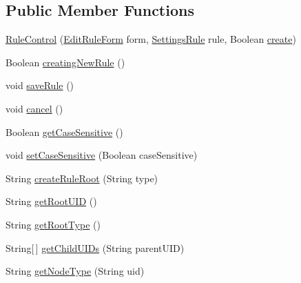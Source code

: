 \subsection*{Public Member Functions}
\begin{DoxyCompactItemize}
\item 
\hyperlink{class_web_analyzer_1_1_u_i_1_1_interaction_objects_1_1_rule_control_a8750fd77bb6508af4f27245be105a4cd}{Rule\+Control} (\hyperlink{class_web_analyzer_1_1_u_i_1_1_edit_rule_form}{Edit\+Rule\+Form} form, \hyperlink{class_web_analyzer_1_1_models_1_1_settings_model_1_1_settings_rule}{Settings\+Rule} rule, Boolean \hyperlink{_u_i_2_h_t_m_l_resources_2js_2lib_2underscore_8min_8js_a8bd5981157799459d39a59e8c4a0de04}{create})
\item 
Boolean \hyperlink{class_web_analyzer_1_1_u_i_1_1_interaction_objects_1_1_rule_control_a536423d979ea29cbc78acd7af260e047}{creating\+New\+Rule} ()
\item 
void \hyperlink{class_web_analyzer_1_1_u_i_1_1_interaction_objects_1_1_rule_control_a94100d3e36e224ebf511dc3f8c18ca27}{save\+Rule} ()
\item 
void \hyperlink{class_web_analyzer_1_1_u_i_1_1_interaction_objects_1_1_rule_control_a800eb65fd64f59274eef8862feb1aa16}{cancel} ()
\item 
Boolean \hyperlink{class_web_analyzer_1_1_u_i_1_1_interaction_objects_1_1_rule_control_a8dab0dfc04ad5b917a3f0b0d66e3b26f}{get\+Case\+Sensitive} ()
\item 
void \hyperlink{class_web_analyzer_1_1_u_i_1_1_interaction_objects_1_1_rule_control_a2d4fe3b5e5bb273fc4289dffa1e9672b}{set\+Case\+Sensitive} (Boolean case\+Sensitive)
\item 
String \hyperlink{class_web_analyzer_1_1_u_i_1_1_interaction_objects_1_1_rule_control_a27dad22845932db3e98f3e9029ba5920}{create\+Rule\+Root} (String type)
\item 
String \hyperlink{class_web_analyzer_1_1_u_i_1_1_interaction_objects_1_1_rule_control_ace7f35f8f3444a5e832e0d2164b41f58}{get\+Root\+U\+I\+D} ()
\item 
String \hyperlink{class_web_analyzer_1_1_u_i_1_1_interaction_objects_1_1_rule_control_a995a79af866a4015dbdea7641eb45717}{get\+Root\+Type} ()
\item 
String\mbox{[}$\,$\mbox{]} \hyperlink{class_web_analyzer_1_1_u_i_1_1_interaction_objects_1_1_rule_control_a2a6e2b40f8c2b2c7be49eaa51eebf71b}{get\+Child\+U\+I\+Ds} (String parent\+U\+I\+D)
\item 
String \hyperlink{class_web_analyzer_1_1_u_i_1_1_interaction_objects_1_1_rule_control_a50c02465d6ffa924e089e567598305f4}{get\+Node\+Type} (String uid)

\end{DoxyCompactItemize}
